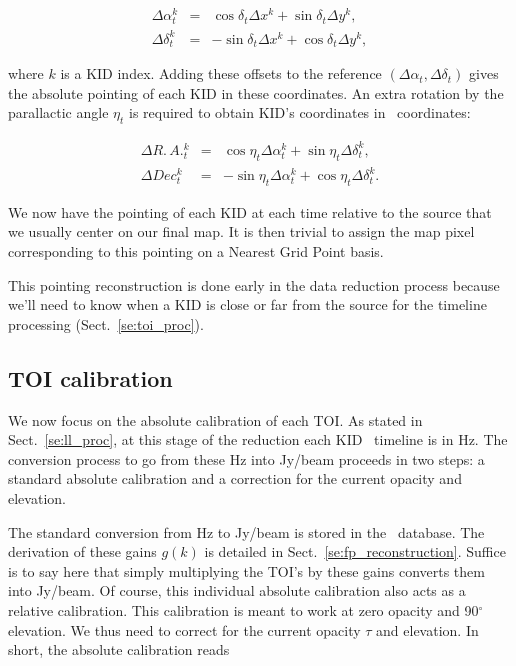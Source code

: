 \begin{eqnarray}
\Delta\alpha^k_t &=&  \cos\delta_t \Delta x^k + \sin\delta_t \Delta y^k, \nonumber\\
\Delta\delta^k_t &=& -\sin\delta_t \Delta x^k + \cos\delta_t \Delta y^k, \nonumber
\end{eqnarray}

where $k$ is a KID index. Adding these offsets to the reference $(\Delta
\alpha_t, \Delta \delta_t)$ gives the absolute pointing of each KID in these
coordinates. An extra rotation by the parallactic angle $\eta_t$ is required to
obtain KID's coordinates in \radec\ coordinates:

\begin{eqnarray}
\Delta R.\,A.^k_t &=&  \cos\eta_t \Delta\alpha^k_t + \sin\eta_t \Delta\delta^k_t,\\
\Delta Dec^k_t    &=& -\sin\eta_t \Delta\alpha^k_t + \cos\eta_t \Delta\delta^k_t.
\end{eqnarray}

We now have the pointing of each KID at each time relative to the source that we
usually center on our final map. It is then trivial to assign the map pixel
corresponding to this pointing on a Nearest Grid Point basis.

This pointing reconstruction is done early in the data reduction process because
we'll need to know when a KID is close or far from the source for the timeline
processing (Sect.~\ref{se:toi_proc}).

\subsection{TOI calibration}
\label{se:flux_calib}

We now focus on the absolute calibration of each TOI. As stated in
Sect.~\ref{se:ll_proc}, at this stage of the reduction each KID \rf~timeline is
in Hz. The conversion process to go from these Hz into Jy/beam proceeds in two
steps: a standard absolute calibration and a correction for the current opacity
and elevation.

The standard conversion from Hz to Jy/beam is stored in the
\kidpar\ database. The derivation of these gains $g(k)$ is detailed in
Sect.~\ref{se:fp_reconstruction}. Suffice is to say here that simply multiplying
the TOI's by these gains converts them into Jy/beam. Of course, this individual
absolute calibration also acts as a relative calibration. This calibration is
meant to work at zero opacity and 90$^\circ$ elevation. We thus need to correct
for the current opacity $\tau$ and elevation. In short, the absolute calibration reads

